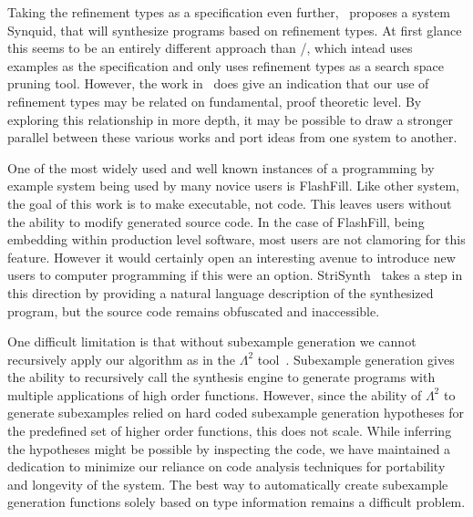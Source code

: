Taking the refinement types as a specification even further,~\cite{dblp1683325} proposes a system Synquid, that will synthesize programs based on refinement types. At first glance this seems to be an entirely different approach than \ourTool/, which intead uses examples as the specification and only uses refinement types as a search space pruning tool. However, the work in~\cite{Osera:2016} does give an indication that our use of refinement types may be related on fundamental, proof theoretic level. By exploring this relationship in more depth, it may be possible to draw a stronger parallel between these various works and port ideas from one system to another.

One of the most widely used and well known instances of a programming by example system being used by many novice users is FlashFill\cite{GulwaniHS12}. Like other system, the goal of this work is to make executable, not code. This leaves users without the ability to modify generated source code. In the case of FlashFill, being embedding within production level software, most users are not clamoring for this feature. However it would certainly open an interesting avenue to introduce new users to computer programming if this were an option. StriSynth~\cite{icse} takes a step in this direction by providing a natural language description of the synthesized program, but the source code remains obfuscated and inaccessible.

One difficult limitation is that without subexample generation we cannot recursively apply our algorithm as in the $\Lambda^2$ tool~\cite{Feser:2015}.
Subexample generation gives the ability to recursively call the synthesis engine to generate programs with multiple applications of high order functions.
However, since the ability of $\Lambda^2$ to generate subexamples relied on hard coded subexample generation hypotheses for the predefined set of higher order functions, this does not scale.
While inferring the hypotheses might be possible by inspecting the code, we have maintained a dedication to minimize our reliance on code analysis techniques for portability and longevity of the system.
The best way to automatically create subexample generation functions solely based on type information remains a difficult problem.
